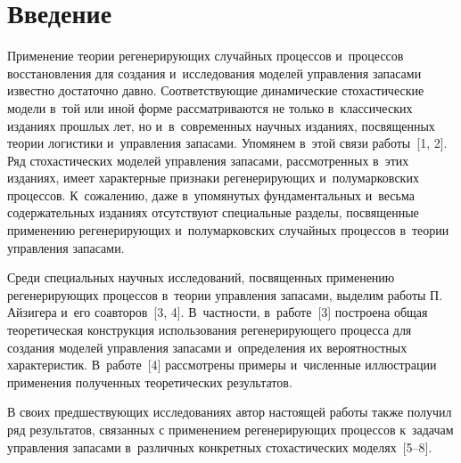   
\vspace*{-4pt}



\thispagestyle{headings}

\begin{multicols}{2}

\label{st\stat}

\section{Введение}

\vspace*{-2pt}

Применение теории регенерирующих случайных процессов и~процессов восстановления 
для создания и~исследования моделей управления запасами известно достаточно 
давно. Соответствующие динамические стохастические модели в~той или иной форме 
рассматриваются не только в~классических изданиях прошлых лет, но 
и~в~современных научных изданиях, посвященных теории логистики и~управления 
запасами. Упомянем в~этой связи работы~[1, 2].  Ряд стохастических моделей 
управ\-ле\-ния запасами, рас\-смот\-рен\-ных в~этих изданиях, имеет характерные признаки 
ре\-ге\-не\-ри\-ру\-ющих и~полумарковских процессов. К~сожалению, даже в~упомянутых 
фундаментальных и~весьма содержательных изданиях отсутствуют специальные 
разделы, посвященные применению ре\-ге\-не\-ри\-ру\-ющих и~полумарковских случайных 
процессов в~тео\-рии управ\-ле\-ния запасами.

Среди специальных научных исследований, посвященных применению ре\-ге\-не\-ри\-ру\-ющих 
процессов в~тео\-рии управ\-ле\-ния запасами, выделим работы П. Айзигера и~его 
соавторов~[3, 4]. В~част\-ности, в~работе~[3] построена общая теоретическая 
конструкция использования ре\-ге\-не\-ри\-ру\-юще\-го процесса для создания моделей 
управления запасами и~определения их вероятностных характеристик. В~работе~[4] 
рассмотрены примеры и~численные иллюстрации применения полученных теоретических 
результатов.

В своих предшествующих исследованиях автор настоящей работы также получил ряд 
результатов, связанных с применением ре\-ге\-не\-ри\-ру\-ющих процессов к~задачам 
управления запасами в~различных конкретных стохастических моделях~[5--8].


\end{multicols}
